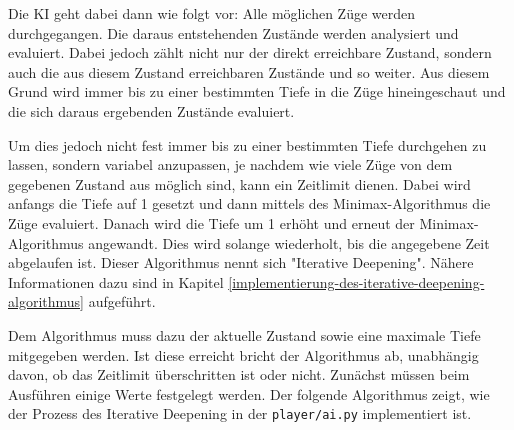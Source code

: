 Die KI geht dabei dann wie folgt vor: Alle möglichen Züge werden
durchgegangen. Die daraus entstehenden Zustände werden analysiert und
evaluiert. Dabei jedoch zählt nicht nur der direkt erreichbare Zustand,
sondern auch die aus diesem Zustand erreichbaren Zustände und so weiter.
Aus diesem Grund wird immer bis zu einer bestimmten Tiefe in die Züge
hineingeschaut und die sich daraus ergebenden Zustände evaluiert.

Um dies jedoch nicht fest immer bis zu einer bestimmten Tiefe durchgehen
zu lassen, sondern variabel anzupassen, je nachdem wie viele Züge von
dem gegebenen Zustand aus möglich sind, kann ein Zeitlimit dienen. Dabei
wird anfangs die Tiefe auf 1 gesetzt und dann mittels des
Minimax-Algorithmus die Züge evaluiert. Danach wird die Tiefe um 1
erhöht und erneut der Minimax-Algorithmus angewandt. Dies wird solange
wiederholt, bis die angegebene Zeit abgelaufen ist. Dieser Algorithmus
nennt sich "Iterative Deepening". Nähere Informationen dazu sind in
Kapitel \ref{implementierung-des-iterative-deepening-algorithmus} aufgeführt.

Dem Algorithmus muss dazu der aktuelle Zustand sowie eine maximale Tiefe
mitgegeben werden. Ist diese erreicht bricht der Algorithmus ab,
unabhängig davon, ob das Zeitlimit überschritten ist oder nicht.
Zunächst müssen beim Ausführen einige Werte festgelegt werden. Der
folgende Algorithmus zeigt, wie der Prozess des Iterative Deepening in
der \texttt{player/ai.py} implementiert ist.


